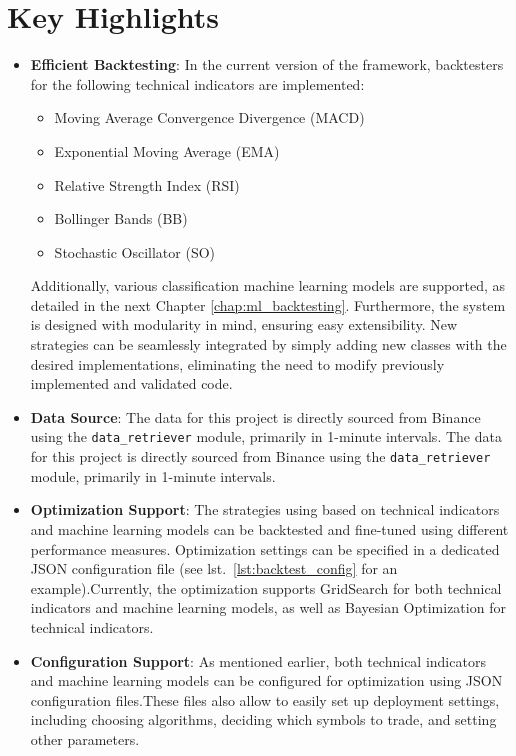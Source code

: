 \section{Key Highlights}

\begin{itemize}
    \item \textbf{Efficient Backtesting}: In the current version of the framework, backtesters for the following technical indicators are implemented:
\begin{itemize}
    \item Moving Average Convergence Divergence (MACD)
    \item Exponential Moving Average (EMA)
    \item Relative Strength Index (RSI)
    \item Bollinger Bands (BB)
    \item Stochastic Oscillator (SO)
\end{itemize}
Additionally, various classification machine learning models are supported, as detailed in the next Chapter \ref{chap:ml_backtesting}.
Furthermore, the system is designed with modularity in mind, ensuring easy extensibility.
New strategies can be seamlessly integrated by simply adding new classes with the desired implementations, eliminating the need to modify previously implemented and validated code.
    \item \textbf{Data Source}: The data for this project is directly sourced from Binance using the \texttt{data\_retriever} module, primarily in 1-minute intervals.
The data for this project is directly sourced from Binance using the \texttt{data\_retriever} module, primarily in 1-minute intervals.

    \item \textbf{Optimization Support}: The strategies using based on technical indicators and machine learning models can be backtested and fine-tuned using different performance measures.
Optimization settings can be specified in a dedicated JSON configuration file (see lst.~\ref{lst:backtest_config} for an example).Currently, the optimization supports GridSearch for both technical indicators and machine learning models, as well as Bayesian Optimization
for technical indicators.

    \item \textbf{Configuration Support}: As mentioned earlier, both technical indicators and machine learning models can be configured for optimization using JSON configuration files.These files also allow to easily set up deployment settings, including choosing algorithms, deciding which symbols to trade, and setting other parameters.


\end{itemize}
